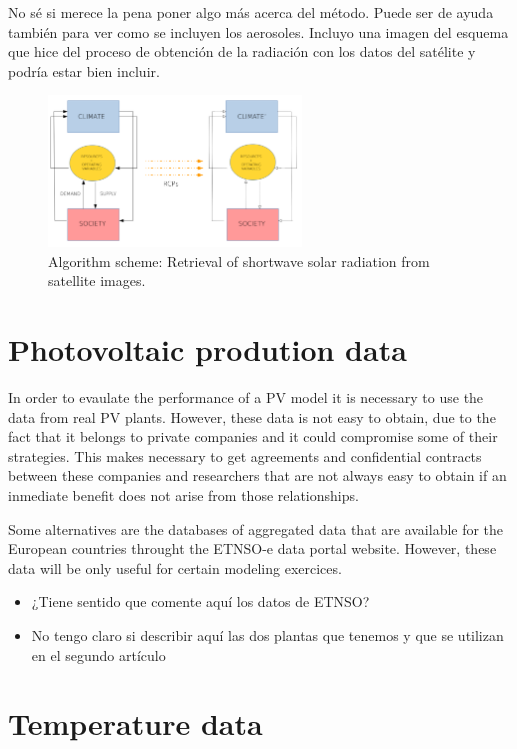 {\color{red} No sé si merece la pena poner algo más acerca del método. Puede ser de ayuda también para ver como se incluyen los aerosoles. Incluyo una imagen del esquema que hice del proceso de obtención de la radiación con los datos del satélite y podría estar bien incluir.}


\begin{figure}
  \centering
  \includegraphics[width=0.6\textwidth]{figs/esquema}
  \caption{Algorithm scheme: Retrieval of shortwave solar radiation from satellite images.}
 \label{fig:algorithm}
\end{figure}

\section{Photovoltaic prodution data}

In order to evaulate the performance of a PV model it is necessary to use the data from real PV plants. However, these data is not easy to obtain, due to the fact that it belongs to private companies and it could compromise some of their strategies. This makes necessary to get agreements and confidential contracts between these companies and researchers that are not always easy to obtain if an inmediate benefit does not arise from those relationships.

Some alternatives are the databases of aggregated data that are available for the European countries throught the ETNSO-e data portal website. However, these data will be only useful for certain modeling exercices.

\begin{itemize}
\item {\color{red} ¿Tiene sentido que comente aquí los datos de ETNSO?}
\item {\color{red}No tengo claro si describir aquí las dos plantas que tenemos y que se utilizan en el segundo artículo}
\end{itemize}

\section{Temperature data}

